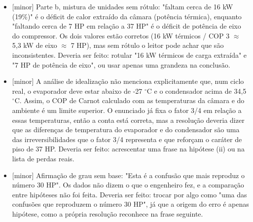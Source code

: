 \documentclass{article}%
\begin{document}
\begin{itemize}%
\item%
{[}minor{]} Parte b, mistura de unidades sem rótulo: "faltam cerca de 16 kW (19\%)" é o déficit de calor extraído da câmara (potência térmica), enquanto "faltando cerca de 7 HP em relação a 37 HP" é o déficit de potência de eixo do compressor. Os dois valores estão corretos (16 kW térmicos / COP 3 $\approx$ 5,3 kW de eixo $\approx$ 7 HP), mas sem rótulo o leitor pode achar que são inconsistentes. Deveria ser feito: rotular "16 kW térmicos de carga extraída" e "7 HP de potência de eixo", ou usar apenas uma grandeza na conclusão.%
\item%
{[}minor{]} A análise de idealização não menciona explicitamente que, num ciclo real, o evaporador deve estar abaixo de -27 $^\circ$C e o condensador acima de 34,5 $^\circ$C. Assim, o COP de Carnot calculado com as temperaturas da câmara e do ambiente é um limite superior. O enunciado já fixa o fator 3/4 em relação a essas temperaturas, então a conta está correta, mas a resolução deveria dizer que as diferenças de temperatura do evaporador e do condensador são uma das irreversibilidades que o fator 3/4 representa e que reforçam o caráter de piso de 37 HP. Deveria ser feito: acrescentar uma frase na hipótese (ii) ou na lista de perdas reais.%
\item%
{[}minor{]} Afirmação de grau sem base: "Esta é a confusão que mais reproduz o número 30 HP". Os dados não dizem o que o engenheiro fez, e a comparação entre hipóteses não foi feita. Deveria ser feito: trocar por algo como "uma das confusões que reproduzem o número 30 HP", já que a origem do erro é apenas hipótese, como a própria resolução reconhece na frase seguinte.%
\end{itemize}%
\end{document}
